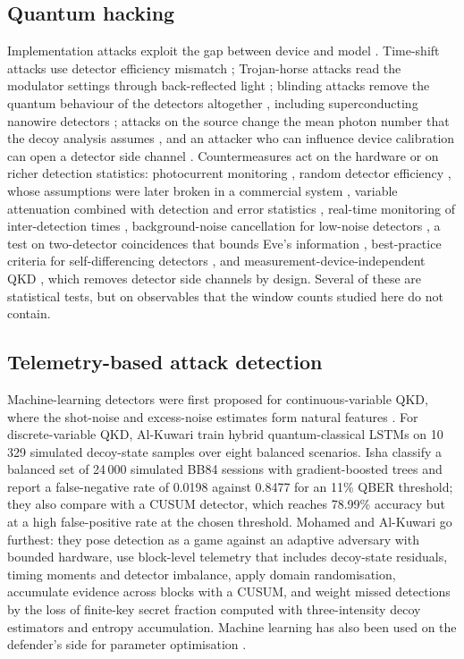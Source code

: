\subsection{Quantum hacking}
Implementation attacks exploit the gap between device and model \cite{scarani2009,xu2020,pirandola2020}. Time-shift attacks use detector efficiency mismatch \cite{zhao2008}; Trojan-horse attacks read the modulator settings through back-reflected light \cite{gisin2006,lucamarini2015}; blinding attacks remove the quantum behaviour of the detectors altogether \cite{makarov2005,lydersen2010,gerhardt2011}, including superconducting nanowire detectors \cite{lydersen2011}; attacks on the source change the mean photon number that the decoy analysis assumes \cite{sajeed2015,huang2019}, and an attacker who can influence device calibration can open a detector side channel \cite{jain2011}. Countermeasures act on the hardware or on richer detection statistics: photocurrent monitoring \cite{yuan2010}, random detector efficiency \cite{lim2015}, whose assumptions were later broken in a commercial system \cite{huang2016}, variable attenuation combined with detection and error statistics \cite{qian2019}, real-time monitoring of inter-detection times \cite{dasilva2012}, background-noise cancellation for low-noise detectors \cite{lee2016}, a test on two-detector coincidences that bounds Eve's information \cite{gras2021}, best-practice criteria for self-differencing detectors \cite{koehlersidki2018}, and measurement-device-independent QKD \cite{lo2012}, which removes detector side channels by design. Several of these are statistical tests, but on observables that the window counts studied here do not contain.

\subsection{Telemetry-based attack detection}
Machine-learning detectors were first proposed for continuous-variable QKD, where the shot-noise and excess-noise estimates form natural features \cite{mao2020,liao2022}. For discrete-variable QKD, Al-Kuwari \etal \cite{alkuwari2026} train hybrid quantum-classical LSTMs on 10\,329 simulated decoy-state samples over eight balanced scenarios. Isha \etal \cite{isha2026} classify a balanced set of 24\,000 simulated BB84 sessions with gradient-boosted trees and report a false-negative rate of 0.0198 against 0.8477 for an 11\% QBER threshold; they also compare with a CUSUM detector, which reaches 78.99\% accuracy but at a high false-positive rate at the chosen threshold. Mohamed and Al-Kuwari \cite{mohamed2026} go furthest: they pose detection as a game against an adaptive adversary with bounded hardware, use block-level telemetry that includes decoy-state residuals, timing moments and detector imbalance, apply domain randomisation, accumulate evidence across blocks with a CUSUM, and weight missed detections by the loss of finite-key secret fraction computed with three-intensity decoy estimators and entropy accumulation. Machine learning has also been used on the defender's side for parameter optimisation \cite{wang2019}.

